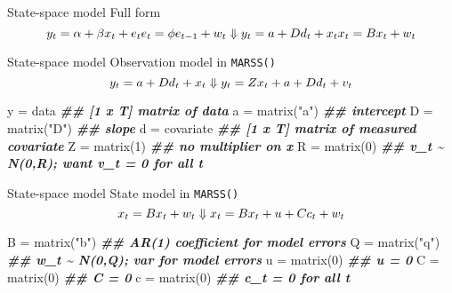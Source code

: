 \documentclass[
  ignorenonframetext,
]{beamer}
\newenvironment{Shaded}{\begin{snugshade}}{\end{snugshade}}
\newcommand{\DecValTok}[1]{\textcolor[rgb]{0.00,0.00,0.81}{#1}}
\newcommand{\DocumentationTok}[1]{\textcolor[rgb]{0.56,0.35,0.01}{\textbf{\textit{#1}}}}
\newcommand{\FunctionTok}[1]{\textcolor[rgb]{0.00,0.00,0.00}{#1}}
\newcommand{\NormalTok}[1]{#1}
\newcommand{\OtherTok}[1]{\textcolor[rgb]{0.56,0.35,0.01}{#1}}
\newcommand{\StringTok}[1]{\textcolor[rgb]{0.31,0.60,0.02}{#1}}
\begin{document}
\begin{frame}{State-space model \textbar{} Full form}
\protect\hypertarget{state-space-model-full-form}{}
\[
y_t = \alpha + \beta x_t + e_t \\
e_t = \phi e_{t-1} + w_t \\
\Downarrow \\
y_t = a + D d_t + x_t\\
x_t = B x_t + w_t
\]
\end{frame}

\begin{frame}[fragile]{State-space model \textbar{} Observation model in
\texttt{MARSS()}}
\protect\hypertarget{state-space-model-observation-model-in-marss}{}
\[
y_t = a + D d_t + x_t \\
\Downarrow \\
y_t = Z x_t + a + D d_t + v_t
\]

\begin{Shaded}
\begin{Highlighting}[]
\NormalTok{y }\OtherTok{=}\NormalTok{ data         }\DocumentationTok{\#\# [1 x T] matrix of data}
\NormalTok{a }\OtherTok{=} \FunctionTok{matrix}\NormalTok{(}\StringTok{"a"}\NormalTok{)  }\DocumentationTok{\#\# intercept}
\NormalTok{D }\OtherTok{=} \FunctionTok{matrix}\NormalTok{(}\StringTok{"D"}\NormalTok{)  }\DocumentationTok{\#\# slope}
\NormalTok{d }\OtherTok{=}\NormalTok{ covariate    }\DocumentationTok{\#\# [1 x T] matrix of measured covariate}
\NormalTok{Z }\OtherTok{=} \FunctionTok{matrix}\NormalTok{(}\DecValTok{1}\NormalTok{)    }\DocumentationTok{\#\# no multiplier on x }
\NormalTok{R }\OtherTok{=} \FunctionTok{matrix}\NormalTok{(}\DecValTok{0}\NormalTok{)    }\DocumentationTok{\#\# v\_t \textasciitilde{} N(0,R); want v\_t = 0 for all t}
\end{Highlighting}
\end{Shaded}
\end{frame}

\begin{frame}[fragile]{State-space model \textbar{} State model in
\texttt{MARSS()}}
\protect\hypertarget{state-space-model-state-model-in-marss}{}
\[
x_t = B x_t + w_t \\
\Downarrow \\
x_t = B x_t + u + C c_t + w_t
\]

\begin{Shaded}
\begin{Highlighting}[]
\NormalTok{B }\OtherTok{=} \FunctionTok{matrix}\NormalTok{(}\StringTok{"b"}\NormalTok{)  }\DocumentationTok{\#\# AR(1) coefficient for model errors}
\NormalTok{Q }\OtherTok{=} \FunctionTok{matrix}\NormalTok{(}\StringTok{"q"}\NormalTok{)  }\DocumentationTok{\#\# w\_t \textasciitilde{} N(0,Q); var for model errors}
\NormalTok{u }\OtherTok{=} \FunctionTok{matrix}\NormalTok{(}\DecValTok{0}\NormalTok{)    }\DocumentationTok{\#\# u = 0}
\NormalTok{C }\OtherTok{=} \FunctionTok{matrix}\NormalTok{(}\DecValTok{0}\NormalTok{)    }\DocumentationTok{\#\# C = 0}
\NormalTok{c }\OtherTok{=} \FunctionTok{matrix}\NormalTok{(}\DecValTok{0}\NormalTok{)    }\DocumentationTok{\#\# c\_t = 0 for all t}
\end{Highlighting}
\end{Shaded}
\end{frame}
\end{document}
